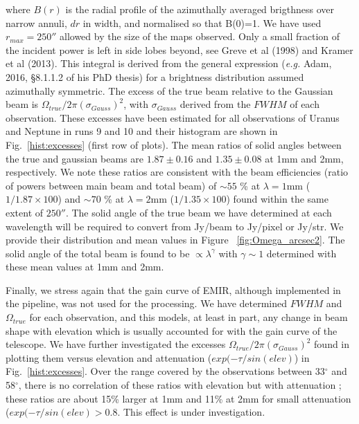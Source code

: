 \noindent where $B(r)$ is the radial profile of the azimuthally averaged brigthness over narrow annuli,  $dr$ in width, and normalised so that B(0)=1.
We have used  $r_{max}=250''$ allowed by the size of the maps observed. Only a small fraction of the incident power is
left in side lobes beyond, see Greve et al (1998) and Kramer et al (2013).
This integral is derived from the general expression ({\it e.g.} Adam, 2016, \S 8.1.1.2 of his PhD thesis) for a
brightness distribution assumed azimuthally symmetric.  The excess
of the true beam relative to the Gaussian beam is $\Omega_{true} / 2 \pi (\sigma_{Gauss})^2$, with  $\sigma_{Gauss}$ derived from
the $FWHM$ of each observation. These excesses have been 
estimated  for all observations of Uranus and Neptune in runs 9 and 10 and their histogram are shown
in Fig.~\ref{hist:excesses} (first row of plots). The mean
ratios of solid angles between the true and gaussian beams are
$1.87\pm0.16$  and $1.35\pm0.08$ at 1mm and 2mm, respectively. We note these ratios are consistent with
the beam efficiencies (ratio of powers between main beam  and   total beam)
of $\sim 55$ \% at $\lambda=1$mm ($1/1.87 \times 100$) and $\sim 70$ \% at $\lambda=2$mm ($1/1.35 \times 100$)
found  within the same extent  of $250''$.
The solid angle of the true beam we have determined at each wavelength will be required to convert from
Jy/beam to Jy/pixel or Jy/str. We provide their distribution and mean values in Figure ~\ref{fig:Omega_arcsec2}. 
The solid angle of the total beam is found to be  $\propto \lambda^{\gamma}$ with $\gamma \sim 1$ determined with these mean values
at 1mm and 2mm.  

Finally, we stress again that the gain curve of EMIR, although implemented in the pipeline, was not used for the processing.
We have determined $FWHM$ and $\Omega_{true}$  for each observation, and this
models, at least in part, any change in beam shape with elevation which is usually accounted
for with the gain curve of the telescope. We have further investigated
the excesses $\Omega_{true} / 2 \pi (\sigma_{Gauss})^2$ found in plotting them versus elevation
and attenuation ($exp(-\tau/sin(elev)$) in Fig.~\ref{hist:excesses}.
Over the range covered by the observations between 33$^{\circ}$ and 58$^{\circ}$, there is no correlation
of these ratios with elevation  but  with  attenuation ; these ratios are about 15\% larger at 1mm and 11\%
at 2mm for small attenuation ($exp(-\tau/sin(elev) > 0.8$. This effect is under investigation. 

